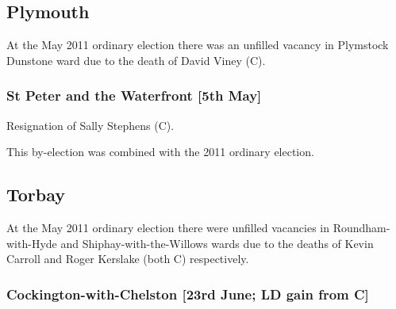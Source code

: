 \begin{resultsiii}
\subsection*{Plymouth}


At the May 2011 ordinary election there was an unfilled vacancy in Plymstock Dunstone ward due to the death of David Viney (C).

\subsubsection*{St Peter and the Waterfront \hspace*{\fill}\nolinebreak[1]%
\enspace\hspace*{\fill}
[5th May]}


Resignation of Sally Stephens (C).

This by-election was combined with the 2011 ordinary election.

\subsection*{Torbay}



At the May 2011 ordinary election there were unfilled vacancies in Roundham-with-Hyde and Shiphay-with-the-Willows wards due to the deaths of Kevin Carroll and Roger Kerslake (both C) respectively.

\subsubsection*{Cockington-with-Chelston \hspace*{\fill}\nolinebreak[1]%
\enspace\hspace*{\fill}
[23rd June; LD gain from C]}



\end{resultsiii}
